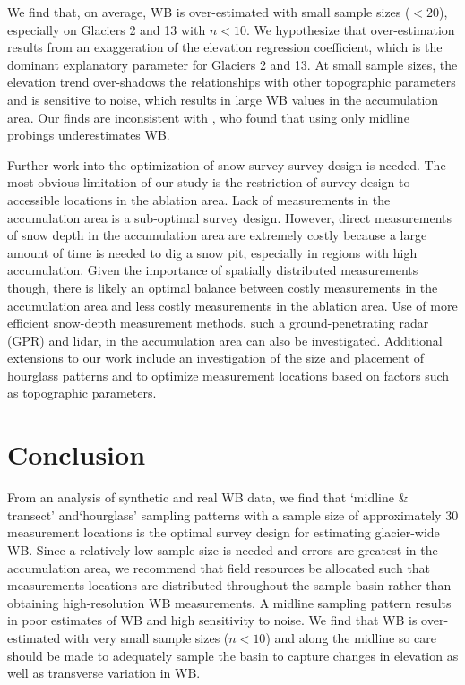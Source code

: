 \documentclass[twocolumn,letterpaper]{igs}
\begin{document}
We find that, on average, WB is over-estimated with small sample sizes ($<20$), especially on Glaciers 2 and 13 with $n<10$. We hypothesize that over-estimation results from an exaggeration of the elevation regression coefficient, which is the dominant explanatory parameter for Glaciers 2 and 13. At small sample sizes, the elevation trend over-shadows the relationships with other topographic parameters and is sensitive to noise, which results in large WB values in the accumulation area. Our finds are inconsistent with \cite{Walmsley2015}, who found that using only midline probings underestimates WB.

Further work into the optimization of snow survey survey design is needed. The most obvious limitation of our study is the restriction of survey design to accessible locations in the ablation area. Lack of measurements in the accumulation area is a sub-optimal survey design. However, direct measurements of snow depth in the accumulation area are extremely costly because a large amount of time is needed to dig a snow pit, especially in regions with high accumulation. Given the importance of spatially distributed measurements though, there is likely an optimal balance between costly measurements in the accumulation area and less costly measurements in the ablation area. Use of more efficient snow-depth measurement methods, such a ground-penetrating radar (GPR) and lidar, in the accumulation area can also be investigated. Additional extensions to our work include an investigation of the size and placement of hourglass patterns and to optimize measurement locations based on factors such as topographic parameters. 


\section{Conclusion}

From an analysis of synthetic and real WB data, we find that `midline \& transect' and`hourglass' sampling patterns with a sample size of approximately 30 measurement locations is the optimal survey design for estimating glacier-wide WB. Since a relatively low sample size is needed and errors are greatest in the accumulation area, we recommend that field resources be allocated such that measurements locations are distributed throughout the sample basin rather than obtaining high-resolution WB measurements. A midline sampling pattern results in poor estimates of WB and high sensitivity to noise. We find that WB is over-estimated with very small sample sizes ($n<10$) and along the midline so care should be made to adequately sample the basin to capture changes in elevation as well as transverse variation in WB. 
\end{document}
